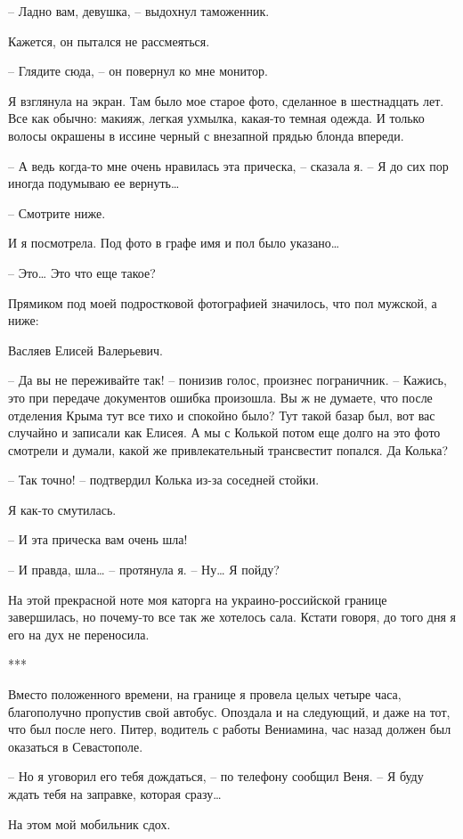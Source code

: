 \documentclass[
]{book}
\begin{document}
-- Ладно вам, девушка, -- выдохнул таможенник.

Кажется, он пытался не рассмеяться.

-- Глядите сюда, -- он повернул ко мне монитор.

Я взглянула на экран. Там было мое старое фото, сделанное в шестнадцать лет. Все как обычно: макияж, легкая ухмылка, какая-то темная одежда. И только волосы окрашены в иссине черный с внезапной прядью блонда впереди.

-- А ведь когда-то мне очень нравилась эта прическа, -- сказала я. -- Я до сих пор иногда подумываю ее вернуть\ldots{}

-- Смотрите ниже.

И я посмотрела. Под фото в графе имя и пол было указано\ldots{}

-- Это\ldots{} Это что еще такое?

Прямиком под моей подростковой фотографией значилось, что пол мужской, а ниже:

Васляев Елисей Валерьевич.

-- Да вы не переживайте так! -- понизив голос, произнес пограничник. -- Кажись, это при передаче документов ошибка произошла. Вы ж не думаете, что после отделения Крыма тут все тихо и спокойно было? Тут такой базар был, вот вас случайно и записали как Елисея. А мы с Колькой потом еще долго на это фото смотрели и думали, какой же привлекательный трансвестит попался. Да Колька?

-- Так точно! -- подтвердил Колька из-за соседней стойки.

Я как-то смутилась.

-- И эта прическа вам очень шла!

-- И правда, шла\ldots{} -- протянула я. -- Ну\ldots{} Я пойду?

На этой прекрасной ноте моя каторга на украино-российской границе завершилась, но почему-то все так же хотелось сала. Кстати говоря, до того дня я его на дух не переносила.

***

Вместо положенного времени, на границе я провела целых четыре часа, благополучно пропустив свой автобус. Опоздала и на следующий, и даже на тот, что был после него. Питер, водитель с работы Вениамина, час назад должен был оказаться в Севастополе.

-- Но я уговорил его тебя дождаться, -- по телефону сообщил Веня. -- Я буду ждать тебя на заправке, которая сразу\ldots{}

На этом мой мобильник сдох.
\end{document}
